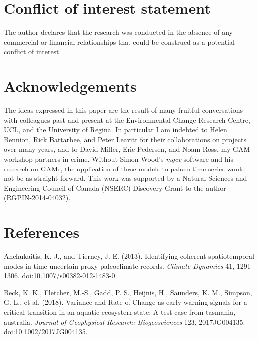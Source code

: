 \documentclass[12pt,]{article}
\begin{document}
\section*{Conflict of interest
statement}\label{conflict-of-interest-statement}

The author declares that the research was conducted in the absence of
any commercial or financial relationships that could be construed as a
potential conflict of interest.

\section*{Acknowledgements}\label{acknowledgements}

The ideas expressed in this paper are the result of many fruitful
conversations with colleagues past and present at the Environmental
Change Research Centre, UCL, and the University of Regina. In particular
I am indebted to Helen Bennion, Rick Battarbee, and Peter Leavitt for
their collaborations on projects over many years, and to David Miller,
Eric Pedersen, and Noam Ross, my GAM workshop partners in crime. Without
Simon Wood's \emph{mgcv} software and his research on GAMs, the
application of these models to palaeo time series would not be as
straight forward. This work was supported by a Natural Sciences and
Engineering Council of Canada (NSERC) Discovery Grant to the author
(RGPIN-2014-04032).

\section*{References}\label{references}

\hypertarget{refs}{}
\hypertarget{ref-Anchukaitis2013-la}{}
Anchukaitis, K. J., and Tierney, J. E. (2013). Identifying coherent
spatiotemporal modes in time-uncertain proxy paleoclimate records.
\emph{Climate Dynamics} 41, 1291--1306.
doi:\href{https://doi.org/10.1007/s00382-012-1483-0}{10.1007/s00382-012-1483-0}.

\hypertarget{ref-Beck2018-zm}{}
Beck, K. K., Fletcher, M.-S., Gadd, P. S., Heijnis, H., Saunders, K. M.,
Simpson, G. L., et al. (2018). Variance and Rate-of-Change as early
warning signals for a critical transition in an aquatic ecosystem state:
A test case from tasmania, australia. \emph{Journal of Geophysical
Research: Biogeosciences} 123, 2017JG004135.
doi:\href{https://doi.org/10.1002/2017JG004135}{10.1002/2017JG004135}.
\end{document}
